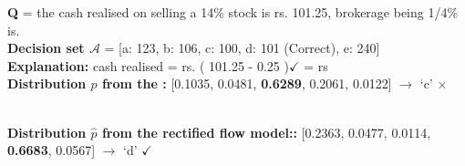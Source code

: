 
\begin{tcolorbox}[title=An example that a negative explanation classified
by the \rlm~is corrected by the rectified flow model $\varphi$ of on $\mathtt{MathQA}$]
    \textbf{Q} =  the cash realised on selling a 14\% stock is rs. 101.25, brokerage being 1/4\% is.\\
    
    \textbf{Decision set $\mathcal{A}$} = [a: 123, b: 106, c: 100, \textcolor{outputcolor}{d: 101 (Correct)}, e: 240]\\
    
    \textbf{{Explanation:}} cash realised = rs. \textcolor{outputcolor}{( 101.25 - 0.25 )$\checkmark$} = rs \\
    
    \textbf{{Distribution $p$ from the \rlm:}} [0.1035, 0.0481, \textbf{0.6289}, 0.2061, 0.0122] $\rightarrow$ `c’ {\color{red}$\boldsymbol{\times}$}\\\
    
    \textbf{{Distribution $\hat{p}$ from the rectified flow model::}} 
[0.2363, 0.0477, 0.0114, \textbf{0.6683}, 0.0567] $\rightarrow$ `d’ \textcolor{outputcolor} {$\checkmark$}\\

\end{tcolorbox}



